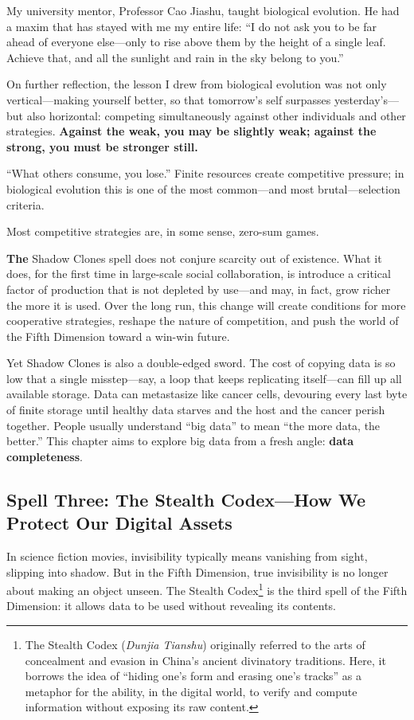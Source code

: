 \vspace{1em}

My university mentor, Professor Cao Jiashu, taught biological evolution. He had a maxim that has stayed with me my entire life: {\kaiti ``I do not ask you to be far ahead of everyone else---only to rise above them by the height of a single leaf. Achieve that, and all the sunlight and rain in the sky belong to you.''}


On further reflection, the lesson I drew from biological evolution was not only vertical---making yourself better, so that tomorrow's self surpasses yesterday's---but also horizontal: competing simultaneously against other individuals and other strategies. \textbf{Against the weak, you may be slightly weak; against the strong, you must be stronger still.}

``What others consume, you lose.'' Finite resources create competitive pressure; in biological evolution this is one of the most common---and most brutal---selection criteria.

\begin{importantbox}
Most competitive strategies are, in some sense, zero-sum games.
\end{importantbox}

\textbf{The} Shadow Clones spell does not conjure scarcity out of existence. What it does, for the first time in large-scale social collaboration, is introduce a critical factor of production that is not depleted by use---and may, in fact, grow richer the more it is used. Over the long run, this change will create conditions for more cooperative strategies, reshape the nature of competition, and push the world of the Fifth Dimension toward a win-win future.

Yet Shadow Clones is also a double-edged sword. The cost of copying data is so low that a single misstep---say, a loop that keeps replicating itself---can fill up all available storage. Data can metastasize like cancer cells, devouring every last byte of finite storage until healthy data starves and the host and the cancer perish together. People usually understand ``big data'' to mean ``the more data, the better.'' This chapter aims to explore big data from a fresh angle: \textbf{data completeness}.

\subsection{Spell Three: The Stealth Codex---How We Protect Our Digital Assets}
In science fiction movies, invisibility typically means vanishing from sight, slipping into shadow. But in the Fifth Dimension, true invisibility is no longer about making an object unseen. The Stealth Codex\footnote{The Stealth Codex (\textit{Dunjia Tianshu}) originally referred to the arts of concealment and evasion in China's ancient divinatory traditions. Here, it borrows the idea of ``hiding one's form and erasing one's tracks'' as a metaphor for the ability, in the digital world, to verify and compute information without exposing its raw content.} is the third spell of the Fifth Dimension: it allows data to be used without revealing its contents.


